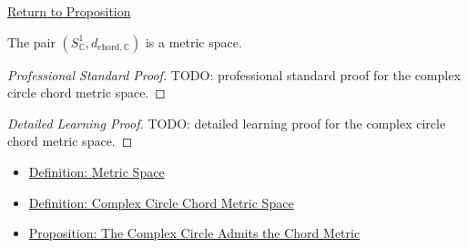 \newpage
{}
\label{prf:complex-circle-chord-metric-space}

\begin{remark*}[Return]
\hyperref[prop:complex-circle-chord-metric-space]{Return to Proposition}
\end{remark*}

\begin{proposition*}
The pair \((S^1_{\mathbb{C}},d_{\mathrm{chord},\mathbb{C}})\) is a metric
space.
\end{proposition*}

\begin{proof}[Professional Standard Proof]
\LRAProofBodyStart
TODO: professional standard proof for the complex circle chord metric space.
\end{proof}

\begin{proof}[Detailed Learning Proof]
\LRAProofBodyStart
TODO: detailed learning proof for the complex circle chord metric space.
\end{proof}

\begin{remark*}
\end{remark*}

\begin{dependencies}
\begin{itemize}
  \item \hyperref[def:metric-space]{Definition: Metric Space}
  \item \hyperref[def:complex-circle-chord-metric-space]{Definition: Complex Circle Chord Metric Space}
  \item \hyperref[prop:complex-circle-chord-metric]{Proposition: The Complex Circle Admits the Chord Metric}
\end{itemize}
\end{dependencies}

\clearpage

